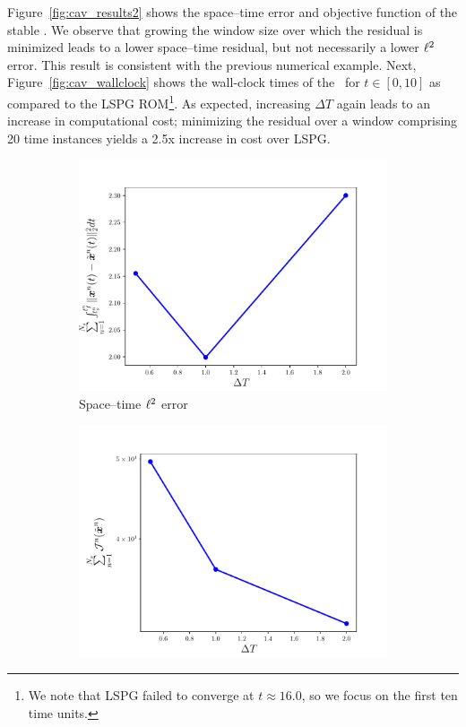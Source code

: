 Figure~\ref{fig:cav_results2} shows the space--time error and objective function of the stable \methodAcronymROMs. We observe that growing the window size over 
which the residual is minimized leads to a lower space--time residual, but not necessarily a lower $\ell^2$ error. This result is consistent with the previous numerical example. Next, Figure~\ref{fig:cav_wallclock}
shows the wall-clock times of the \methodAcronymROMs\ for $t \in [0,10]$ as compared to the LSPG ROM\footnote{We note that LSPG failed to converge at $t \approx 16.0$, so we focus on the first ten time units.}. As expected, increasing $\Delta T$ again leads to an increase in computational cost; minimizing the residual over a window comprising 20 time instances yields a 2.5x increase in cost over LSPG. 


\begin{figure}
\begin{center}
\begin{subfigure}[t]{0.45\textwidth}
\includegraphics[trim={0cm 0cm 0cm 0cm},clip,width=1.\linewidth]{figs/cavity/error_vs_window_basis2.pdf}
\caption{Space--time $\ell^2$ error}
\label{fig:cav_results2a}
\end{subfigure}
\begin{subfigure}[t]{0.45\textwidth}
\includegraphics[trim={0cm 0cm 0cm 0cm},clip,width=1.\linewidth]{figs/cavity/objective_vs_window_basis2.pdf}

\end{subfigure}
\end{center}
\end{figure}
